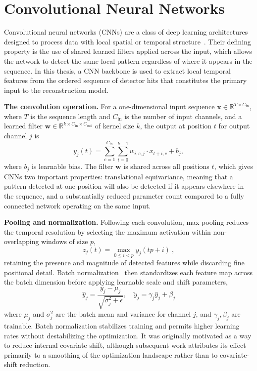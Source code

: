 \section{Convolutional Neural Networks}

Convolutional neural networks (CNNs) are a class of deep learning architectures designed to process data with local spatial or temporal structure~. Their defining property is the use of shared learned filters applied across the input, which allows the network to detect the same local pattern regardless of where it appears in the sequence. In this thesis, a CNN backbone is used to extract local temporal features from the ordered sequence of detector hits that constitutes the primary input to the reconstruction model.

\textbf{The convolution operation.} For a one-dimensional input sequence $\textbf{x} \in \mathbb{R}^{T\times C_{\text{in}}}$, where $T$ is the sequence length and $C_{\text{in}}$ is the number of input channels, and a learned filter $\textbf{w} \in \mathbb{R}^{k\times C_{\text{in}}\times C_{\text{out}}}$ of kernel size $k$, the output at position $t$ for output channel $j$ is
\begin{equation}
    y_j(t) = \sum_{c=1}^{C_\text{in}} \sum_{i=0}^{k-1} w_{i,c,j} \cdot x_{t+i,c} + b_j,
\end{equation}
where $b_j$ is learnable bias. The filter $\textbf{w}$ is shared across all positions $t$, which gives CNNs two important properties: translational equivariance, meaning that a pattern detected at one position will also be detected if it appears elsewhere in the sequence, and a substantially reduced parameter count compared to a fully connected network operating on the same input.

\textbf{Pooling and normalization.} Following each convolution, max pooling reduces the temporal resolution by selecting the maximum activation within non-overlapping windows of size $p$,
\begin{equation}
    z_j(t) = \max_{0\leq i <p}{ y_j (tp +i)} \ ,
\end{equation}
retaining the presence and magnitude of detected features while discarding fine positional detail. Batch normalization~ then standardizes each feature map across the batch dimension before applying learnable scale and shift parameters,
\begin{equation}
    \hat{y}_j = \frac{y_j - \mu_j}{\sqrt{\sigma^2_j + \epsilon}}, \quad \tilde{y}_j = \gamma_j \hat{y}_j + \beta_j
\end{equation}
where $\mu_j$ and $\sigma^2_j$ are the batch mean and variance for channel $j$, and $\gamma_j, \beta_j$ are trainable. Batch normalization stabilizes training and permits higher learning rates without destabilizing the optimization. It was originally motivated as a way to reduce internal covariate shift, although subsequent work attributes its effect primarily to a smoothing of the optimization landscape rather than to covariate-shift reduction.


